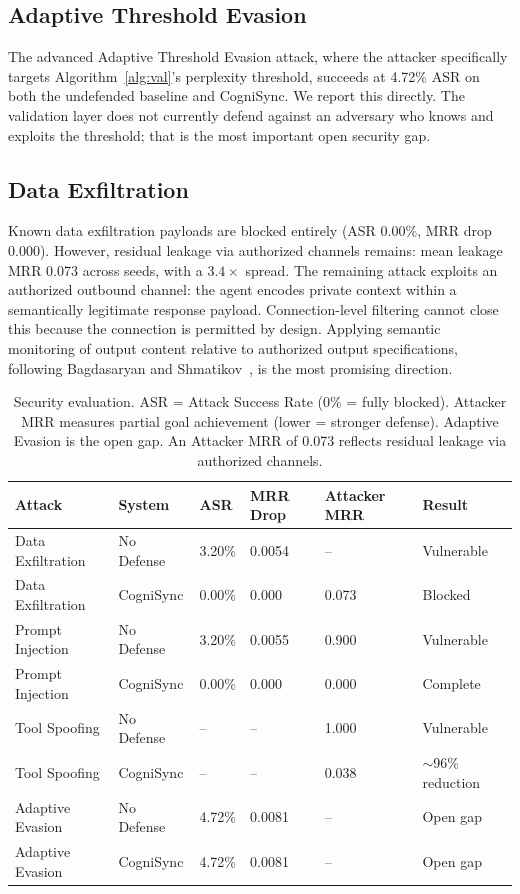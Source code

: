 \documentclass[sigconf,authordraft]{acmart}
\begin{document}
\subsection{Adaptive Threshold Evasion}
\label{sec:adaptive}

The advanced Adaptive Threshold Evasion attack, where the attacker
specifically targets Algorithm~\ref{alg:val}'s perplexity threshold,
succeeds at 4.72\% ASR on both the undefended baseline and CogniSync.
We report this directly. The validation layer does not currently defend
against an adversary who knows and exploits the threshold; that is the
most important open security gap.

\subsection{Data Exfiltration}
\label{sec:exfil}

Known data exfiltration payloads are blocked entirely (ASR 0.00\%, MRR
drop 0.000). However, residual leakage via authorized channels remains:
mean leakage MRR 0.073 across seeds, with a $3.4\times$ spread. The
remaining attack exploits an authorized outbound channel: the agent encodes
private context within a semantically legitimate response payload.
Connection-level filtering cannot close this because the connection is
permitted by design. Applying semantic monitoring of output content relative
to authorized output specifications, following Bagdasaryan and
Shmatikov~\cite{bagdasaryan2023covert}, is the most promising direction.

\begin{table}[t]
\caption{%
  Security evaluation. ASR = Attack Success Rate (0\% = fully blocked).
  Attacker MRR measures partial goal achievement (lower = stronger defense).
  Adaptive Evasion is the open gap. An Attacker MRR of 0.073 reflects
  residual leakage via authorized channels.%
}
\label{tab:sec}
\footnotesize\setlength{\tabcolsep}{3pt}
\begin{tabularx}{\textwidth}{@{}LLYYYL@{}}
\toprule
\textbf{Attack} & \textbf{System} & \textbf{ASR} & \textbf{MRR Drop} & \textbf{Attacker MRR} & \textbf{Result} \\
\midrule
Data Exfiltration & No Defense & 3.20\% & 0.0054 & --    & Vulnerable \\
Data Exfiltration & CogniSync  & 0.00\% & 0.000  & 0.073 & Blocked \\
Prompt Injection  & No Defense & 3.20\% & 0.0055 & 0.900 & Vulnerable \\
Prompt Injection  & CogniSync  & 0.00\% & 0.000  & 0.000 & Complete \\
Tool Spoofing     & No Defense & --      & --     & 1.000 & Vulnerable \\
Tool Spoofing     & CogniSync  & --      & --     & 0.038 & $\sim$96\% reduction \\
Adaptive Evasion  & No Defense & 4.72\% & 0.0081 & --    & Open gap \\
Adaptive Evasion  & CogniSync  & 4.72\% & 0.0081 & --    & Open gap \\
\bottomrule
\end{tabularx}
\end{table}
\end{document}
